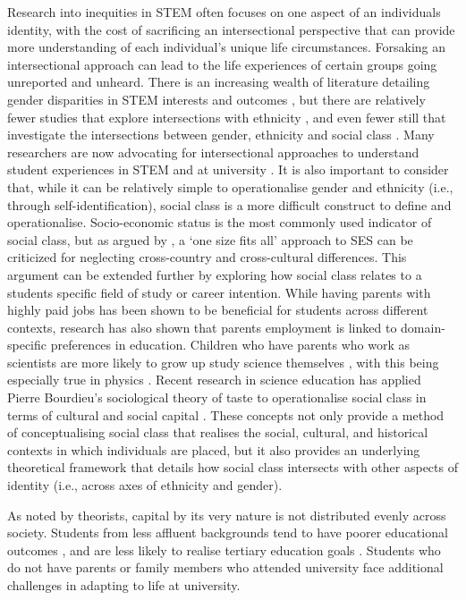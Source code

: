 Research into inequities in STEM often focuses on one aspect of an individuals identity, with the cost of sacrificing an intersectional perspective that can provide more understanding of each individual's unique life circumstances. Forsaking an intersectional approach can lead to the life experiences of certain groups going unreported and unheard. There is an increasing wealth of literature detailing gender disparities in STEM interests and outcomes \citep{Sue2009,wang2017gender}, but there are relatively fewer studies that explore intersections with ethnicity \citep{fouad2017scct,grossman2014perceived}, and even fewer still that investigate the intersections between gender, ethnicity and social class \citep{archer2013aspires}. Many researchers are now advocating for intersectional approaches to understand student experiences in STEM and at university \citep{jury2017experience}. It is also important to consider that, while it can be relatively simple to operationalise gender and ethnicity (i.e., through self-identification), social class is a more difficult construct to define and operationalise. Socio-economic status is the most commonly used indicator of social class, but as argued by \cite{rutkowski2013measuring}, a `one size fits all' approach to SES can be criticized for neglecting cross-country and cross-cultural differences. This argument can be extended further by exploring how social class relates to a students specific field of study or career intention. While having parents with highly paid jobs has been shown to be beneficial for students across different contexts, research has also shown that parents employment is linked to domain-specific preferences in education. Children who have parents who work as scientists are more likely to grow up study science themselves \cite{moakler2014college}, with this being especially true in physics \citep{upshot}. Recent research in science education has applied Pierre Bourdieu's sociological theory of taste to operationalise social class in terms of cultural and social capital \citep{Archer_2015}. These concepts not only provide a method of conceptualising social class that realises the social, cultural, and historical contexts in which individuals are placed, but it also provides an underlying theoretical framework that details how social class intersects with other aspects of identity (i.e., across axes of ethnicity and gender). 

As noted by theorists, capital by its very nature is not distributed evenly across society. Students from less affluent backgrounds tend to have poorer educational outcomes \cite{May_2016}, and are less likely to realise tertiary education goals \cite{reynolds2011change}. Students who do not have parents or family members who attended university face additional challenges in adapting to life at university. 

